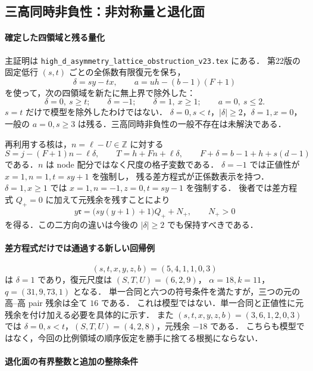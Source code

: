 \subsection{三高同時非負性：非対称量と退化面}
\label{notes:hd23}

\paragraph{確定した四領域と残る量化}

主証明は \nolinkurl{high_d_asymmetry_lattice_obstruction_v23.tex} にある．
第22版の固定低行 $(s,t)$ ごとの全係数有限復元を保ち，
\[
 \delta=sy-tx,\qquad a=uh-(b-1)(F+1)
\]
を使って，次の四領域を新たに無上界で除外した：
\[
 \delta=0,\ s\ge t;\qquad
 \delta=-1;\qquad
 \delta=1,\ x\ge1;\qquad
 a=0,\ s\le2.
\]
$s=t$ だけで模型を除外したわけではない．
$\delta=0,s<t$，$|\delta|\ge2$，$\delta=1,x=0$，
一般の $a=0,s\ge3$ は残る．三高同時非負性の一般不存在は未解決である．

再利用する核は，$n=\ell-U\in\mathbb Z$ に対する
\[
 S=j-(F+1)n-\ell\delta,\qquad
 T=h+Fn+\ell\delta,
 \qquad F+\delta=b-1+h+s(d-1)
\]
である．$n$ は node 配分ではなく尺度の格子変数である．
$\delta=-1$ では正値性が $x=1,n=1,t=sy+1$ を強制し，
残る差方程式が正係数表示を持つ．
$\delta=1,x\ge1$ では $x=1,n=-1,z=0,t=sy-1$ を強制する．
後者では差方程式 $Q_+=0$ に加えて元残余を残すことにより
\[
 y\mathfrak r=\bigl(sy(y+1)+1\bigr)Q_++N_+,
 \qquad N_+>0
\]
を得る．この二方向の違いは今後の $|\delta|\ge2$ でも保持すべきである．

\paragraph{差方程式だけでは通過する新しい回帰例}

\[
 (s,t,x,y,z,b)=(5,4,1,1,0,3)
\]
は $\delta=1$ であり，復元尺度は $(S,T,U)=(6,2,9)$，
$\alpha=18,k=11$，$q=(31,9,73,1)$ となる．
単一合同と六つの符号条件を満たすが，三つの元の高--高 pair 残余は全て $16$ である．
これは模型ではない．単一合同と正値性に元残余を付け加える必要を具体的に示す．
また $(s,t,x,y,z,b)=(3,6,1,2,0,3)$ では
$\delta=0,s<t$，$(S,T,U)=(4,2,8)$，元残余 $-18$ である．
こちらも模型ではなく，今回の比例領域の順序仮定を勝手に捨てる根拠にならない．

\paragraph{退化面の有界整数と追加の整除条件}


